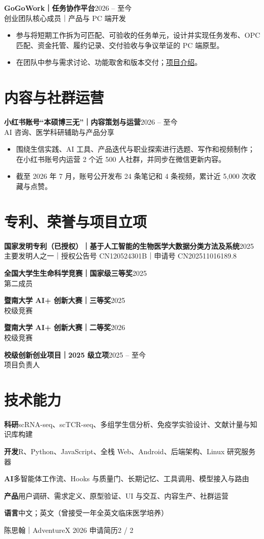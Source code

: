 \documentclass[10.5pt,a4paper]{ctexart}
\newcommand{\entry}[3]{%
  \textbf{#1}\hfill{\small\color{muted}#2}\\[-1pt]
  {\small\color{muted}#3}\par
}
\newcommand{\projectentry}[3]{%
  \textbf{#1}\hfill{\small\color{muted}#2}\\[-1pt]
  {\small\color{navy}#3}\par
}
\newcommand{\skillline}[2]{%
  \textbf{#1}\quad #2\par\vspace{2.5pt}
}
\begin{document}
\projectentry{GoGoWork｜任务协作平台}{2026 -- 至今}{创业团队核心成员｜产品与 PC 端开发}
\begin{itemize}
  \item 参与将短期工作拆为可匹配、可验收的任务单元，设计并实现任务发布、OPC 匹配、资金托管、履约记录、交付验收与争议举证的 PC 端原型。
  \item 在团队中参与需求讨论、功能取舍和版本交付；\href{https://mp.weixin.qq.com/s/SlfiV_kPU5RST9fHOxSfCg}{项目介绍}。
\end{itemize}

\section{内容与社群运营}

\entry{小红书账号“本硕博三无”｜内容策划与运营}{2026 -- 至今}{AI 咨询、医学科研辅助与产品分享}
\begin{itemize}
  \item 围绕生信实践、AI 工具、产品迭代与职业探索进行选题、写作和视频制作；在小红书账号内运营 2 个近 500 人社群，并同步在微信更新内容。
  \item 截至 2026 年 7 月，账号公开发布 24 条笔记和 4 条视频，累计近 5,000 次收藏与点赞。
\end{itemize}

\section{专利、荣誉与项目立项}

\entry{国家发明专利（已授权）｜基于人工智能的生物医学大数据分类方法及系统}{2025}{主要发明人之一｜授权公告号 CN120524301B｜申请号 CN202511016189.8}
\vspace{3pt}

\entry{全国大学生生命科学竞赛｜国家级三等奖}{2025}{第二成员}
\vspace{3pt}
\entry{暨南大学 AI+ 创新大赛｜三等奖}{2025}{校级竞赛}
\vspace{3pt}
\entry{暨南大学 AI+ 创新大赛｜二等奖}{2026}{校级竞赛}
\vspace{3pt}
\entry{校级创新创业项目｜2025 级立项}{2025 -- 至今}{项目负责人}

\section{技术能力}

\skillline{科研}{scRNA-seq、scTCR-seq、多组学生信分析、免疫学实验设计、文献计量与知识库构建}
\skillline{开发}{R、Python、JavaScript、全栈 Web、Android、后端架构、Linux 研究服务器}
\skillline{AI}{多智能体工作流、Hooks 与质量门、长期记忆、工具调用、模型接入与路由}
\skillline{产品}{用户调研、需求定义、原型验证、UI 与交互、内容生产、社群运营}
\skillline{语言}{中文；英文（曾接受一年全英文临床医学培养）}

\vfill
{\footnotesize\color{muted}陈思翰｜AdventureX 2026 申请简历}\hfill{\footnotesize\color{muted}2 / 2}
\end{document}
